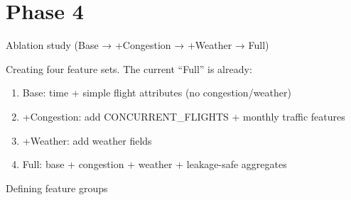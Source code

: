 \documentclass[11pt]{article}
\makeatletter
\newcommand{\boxspacing}{\kern\kvtcb@left@rule\kern\kvtcb@boxsep}
\newcommand{\prompt}[4]{
        {\ttfamily\llap{{\color{#2}[#3]:\hspace{3pt}#4}}\vspace{-\baselineskip}}
    }
\makeatother
\begin{document}
    
    \begin{tcolorbox}[breakable, size=fbox, boxrule=1pt, pad at break*=1mm,colback=cellbackground, colframe=cellborder]
\prompt{In}{incolor}{ }{\boxspacing}
\begin{Verbatim}[commandchars=\\\{\}]

\end{Verbatim}
\end{tcolorbox}

    \begin{tcolorbox}[breakable, size=fbox, boxrule=1pt, pad at break*=1mm,colback=cellbackground, colframe=cellborder]
\prompt{In}{incolor}{ }{\boxspacing}
\begin{Verbatim}[commandchars=\\\{\}]

\end{Verbatim}
\end{tcolorbox}

    \begin{tcolorbox}[breakable, size=fbox, boxrule=1pt, pad at break*=1mm,colback=cellbackground, colframe=cellborder]
\prompt{In}{incolor}{ }{\boxspacing}
\begin{Verbatim}[commandchars=\\\{\}]

\end{Verbatim}
\end{tcolorbox}

    \section{Phase 4}\label{phase-4}

    Ablation study (Base → +Congestion → +Weather → Full)

Creating four feature sets. The current ``Full'' is already:

\begin{enumerate}
\def\labelenumi{\arabic{enumi}.}
\item
  Base: time + simple flight attributes (no congestion/weather)
\item
  +Congestion: add CONCURRENT\_FLIGHTS + monthly traffic features
\item
  +Weather: add weather fields
\item
  Full: base + congestion + weather + leakage-safe aggregates
\end{enumerate}

    Defining feature groups
\end{document}
